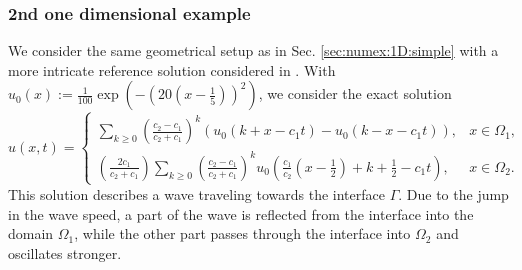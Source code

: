 \documentclass[sn-mathphys-num]{sn-jnl}
\numberwithin{equation}{section}
\begin{document}
\begin{comment}
                \draw[dashed,gray,very thick] (0.4,-2) -- (0.4,2);
                \draw[dashed,gray,very thick] (0.63188,-2) -- (0.63188,2);
                \node [draw=none] at (axis description cs:0.38,0.65) {\color{gray} $\Gamma_1$};
                \node [draw=none] at (axis description cs:0.71,0.65) {\color{gray} $\Gamma_2$};
                \node [draw=none] at (axis description cs:0.2,0.15) {\color{gray} $\omega$};
                \node [draw=none] at (axis description cs:0.8,0.15) {\color{gray} $\omega$};
                

            \end{groupplot}
        \end{tikzpicture}
    \end{center}
    \caption{Exact solution (left) and approximated solution with $k = 3$ (right) of \eqref{eq:1D:exact:simpleMult} at $t = 0.25$ with $c_1 = c_3 = 11.5$ and $c_2 = 1.0$ (uniform mesh), computed with $64$ points in space, $32$ in time and $T = 0.5$.}
    \label{fig:jumpCoefs:multipleJumps3}
  \end{figure}
\end{comment}

\subsubsection{2nd one dimensional example}
We consider the same geometrical setup as in Sec. \ref{sec:numex:1D:simple} with a more intricate reference solution considered in \cite{BDE22,MEMM19}. With $u_0 (x) := \frac{1}{100} \exp(-(20(x-\frac{1}{5}))^2)$, we consider the exact solution 
\begin{equation}\label{eq:1D:complicatedSol}
    u(x,t) = \begin{cases}
      \sum_{k \ge 0} \left( \frac{c_2-c_1}{c_2+c_1}\right)^k \left( u_0 (k + x - c_1 t) - u_0(k-x-c_1 t)\right), &x \in \Omega_1, \\
      \left( \frac{2c_1}{c_2+c_1}\right) \sum_{k \ge 0} \left( \frac{c_2 - c_1}{c_2 + c_1}\right)^k u_0 \left( \frac{c_1}{c_2} \left( x - \frac{1}{2}\right) +k + \frac{1}{2} - c_1 t \right), & x \in \Omega_2. 
    \end{cases}
\end{equation}
This solution describes a wave traveling towards the interface $\Gamma$. Due to the jump in the wave speed, a part of the wave is reflected from the interface into the domain $\Omega_1$, while the other part passes through the interface into $\Omega_2$ and oscillates stronger. 
\end{document}

